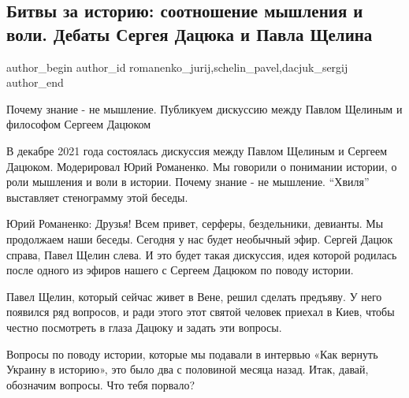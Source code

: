  
 
 
 
 
\subsection{Битвы за историю: соотношение мышления и воли. Дебаты Сергея Дацюка и Павла Щелина}
\label{sec:19_01_2022.stz.news.ua.hvylya.1.bitvy_za_istoriu}

\ifcmt
 author_begin
   author_id romanenko_jurij,schelin_pavel,dacjuk_sergij
 author_end
\fi

\begin{zznagolos}
Почему знание - не мышление. Публикуем дискуссию между Павлом Щелиным и философом Сергеем Дацюком
\end{zznagolos}

В декабре 2021 года состоялась дискуссия между Павлом Щелиным и Сергеем
Дацюком. Модерировал Юрий Романенко. Мы говорили о понимании истории, о роли
мышления и воли в истории. Почему знание - не мышление. \enquote{Хвиля} выставляет
стенограмму этой беседы. 

\begin{zzquote}
Юрий Романенко: Друзья! Всем привет, серферы, бездельники, девианты. Мы
продолжаем наши беседы. Сегодня у нас будет необычный эфир. Сергей Дацюк
справа, Павел Щелин слева. И это будет такая дискуссия, идея которой родилась
после одного из эфиров нашего с Сергеем Дацюком по поводу истории.

Павел Щелин, который сейчас живет в Вене, решил сделать предъяву. У него
появился ряд вопросов, и ради этого этот святой человек приехал в Киев, чтобы
честно посмотреть в глаза Дацюку и задать эти вопросы.

Вопросы по поводу истории, которые мы подавали в интервью «Как вернуть Украину
в историю», это было два с половиной месяца назад. Итак, давай, обозначим
вопросы. Что тебя порвало? 
\end{zzquote}

